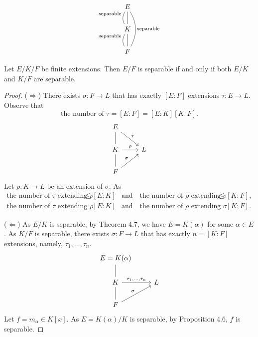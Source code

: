 \documentclass[twoside]{article}
\theoremstyle{remark}
\begin{document}
\begin{displaymath}
  \begin{tikzcd}
    E\dar[dash]\dar[dash,bend right,"\text{separable}"swap]\ar[dd,dash,bend left,"\text{separable}"] \\
    K\dar[dash]\dar[dash,bend right,"\text{separable}"swap] \\
    F
  \end{tikzcd}
\end{displaymath}

\begin{proposition}
  Let \(E/K/F\) be finite extensions. Then \(E/F\) is separable if and only if both \(E/K\) and \(K/F\) are separable.
\end{proposition}

\begin{proof}
  (\(\Rightarrow\)) There exists \(\sigma\colon F \to L\) that has exactly \([E:F]\) extensions \(\tau\colon E \to L\). Observe that
  \[ \text{the number of \(\tau\)} = [E:F] = [E:K][K:F]. \]
  \begin{displaymath}
    \begin{tikzcd}
      E\drar["\tau"]\dar[dash] \\
      K\rar["\rho"]\dar[dash] & L \\
      F\urar["\sigma"]
    \end{tikzcd}
  \end{displaymath}
  Let \(\rho\colon K \to L\) be an extension of \(\sigma\). As
  \begin{align*}
    \text{the number of \(\tau\) extending \(\rho\)} & \leq [E:K] & \text{and} \quad \text{the number of \(\rho\) extending \(\sigma\)} & \leq [K:F], \\
    \text{the number of \(\tau\) extending \(\rho\)} & = [E:K] & \text{and} \quad \text{the number of \(\rho\) extending \(\sigma\)} & = [K;F].
  \end{align*}
  
  (\(\Leftarrow\)) As \(E/K\) is separable, by Theorem 4.7, we have \(E = K(\alpha)\) for some \(\alpha \in E\). As \(K/F\) is separable, there exists \(\sigma\colon F \to L\) that has exactly \(n = [K:F]\) extensions, namely, \(\tau_1, \dots, \tau_n\).
  \begin{displaymath}
    \begin{tikzcd}
      E = K(\alpha) \dar[dash] \\
      K \dar[dash]\rar["{\tau_1, \dots, \tau_n}"] & L \\
      F \urar["\sigma"]
    \end{tikzcd}
  \end{displaymath}
  Let \(f = m_\alpha \in K[x]\). As \(E = K(\alpha)/K\) is separable, by Proposition 4.6, \(f\) is separable.
  

\end{proof}
\end{document}

